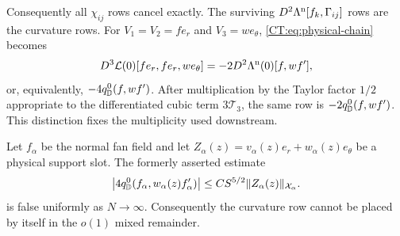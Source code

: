 Consequently all $\chi_{ij}$ rows cancel exactly.  The surviving
$D^2\Lambda^{\rm n}[f_k,\Gamma_{ij}]$ rows are the curvature rows.  For
$V_1=V_2=fe_r$ and $V_3=we_\theta$, \eqref{CT:eq:physical-chain} becomes
\begin{equation}\label{CT:eq:tangent-special}
 D^3\mathcal L(0)[fe_r,fe_r,we_\theta]
 =-2D^2\Lambda^{\rm n}(0)[f,wf'],
\end{equation}
or, equivalently, $-4q_{\mathbb D}^{0}(f,wf')$.  After multiplication by the Taylor
factor $1/2$ appropriate to the differentiated cubic term
$3\mathcal T_3$, the same row is $-2q_{\mathbb D}^{0}(f,wf')$.  This distinction fixes
the multiplicity used downstream.

\begin{proposition}
\label{CT:prop:curvature-counterexample}
Let $f_\alpha$ be the normal fan field and let
$Z_\alpha(z)=v_\alpha(z)e_r+w_\alpha(z)e_\theta$ be a physical support
slot.  The formerly asserted estimate
\begin{equation}\label{CT:eq:curvature-absolute}
 \left|4q_{\mathbb D}^{0}(f_\alpha,w_\alpha(z)f_\alpha')\right|
 \le CS^{5/2}\|Z_\alpha(z)\|_{\mathcal X_\alpha}.
\end{equation}
is false uniformly as $N\to\infty$.  Consequently the curvature row cannot
be placed by itself in the $o(1)$ mixed remainder.
\end{proposition}

